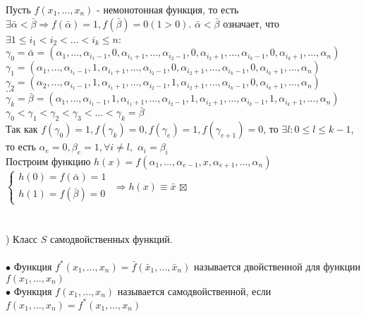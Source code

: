 \documentclass[a4paper, 12pt]{report}
\newcommand{\RomanNumeralCaps}[1]
    {\MakeUppercase{\romannumeral #1}}
\newenvironment{Proof} %
{\par\noindent{$\blacklozenge$}} %
{\hfill$\scriptstyle\boxtimes$} %
\begin{document}
\begin{Proof}
Пусть $f(x_1, \dots, x_n)$ - немонотонная функция, то есть $\exists \bar \alpha < \bar \beta \Rightarrow f(\bar \alpha) = 1, f(\bar \beta) = 0 (1 > 0)$. $\bar \alpha < \bar \beta$ означает, что $\exists 1 \leqslant i_1 < i_2 < \dots < i_k \leqslant n$:\\
$\gamma_0 = \bar \alpha = (\alpha_1, \dots, \alpha_{i_1-1}, 0, \alpha_{i_1+1}, \dots, \alpha_{i_{2}-1}, 0, \alpha_{i_2 +1}, \dots, \alpha_{i_k -1}, 0, \alpha_{i_k +1},\dots,  \alpha_n)$  \\
$\gamma_1 = (\alpha_1, \dots, \alpha_{i_1-1}, 1, \alpha_{i_1+1}, \dots, \alpha_{i_{2}-1}, 0, \alpha_{i_2 +1}, \dots, \alpha_{i_k -1}, 0, \alpha_{i_k +1}, \dots,  \alpha_n)$  \\
$\gamma_2 = (\alpha_2, \dots, \alpha_{i_1-1}, 1, \alpha_{i_1+1}, \dots, \alpha_{i_{2}-1}, 1, \alpha_{i_2 +1}, \dots, \alpha_{i_k -1}, 0, \alpha_{i_k +1}, \dots,  \alpha_n)$  \\
$\dots$\\
$\gamma_k = \bar \beta = (\alpha_1, \dots, \alpha_{i_1-1}, 1, \alpha_{i_1+1}, \dots, \alpha_{i_{2}-1}, 1, \alpha_{i_2 +1}, \dots, \alpha_{i_k -1}, 1, \alpha_{i_k +1}, \dots,  \alpha_n)$  \\
$\gamma_0 < \gamma_1 < \gamma_2 < \gamma_3 < \dots < \gamma_k = \bar \beta$\\
Так как $f(\gamma_0) = 1, f(\gamma_k) = 0, f(\gamma_e) = 1, f(\gamma_{e+1}) = 0$, то $\exists l: 0 \leqslant l \leqslant k-1$, то есть $\alpha_e = 0, \beta_e = 1, \forall i \neq l,$  $\alpha_i = \beta_i$\\
Построим функцию $h(x) = f(\alpha_1, \dots, \alpha_{e-1}, x, \alpha_{e+1}, \dots, \alpha_n)$\\
$\begin{cases}
    h(0)  =  f(\bar \alpha) = 1 \\
    h(1) = f(\bar \beta) = 0
  \end{cases}$ $\Rightarrow h(x) \equiv \bar x$
\end{Proof}\\\\\\
\RomanNumeralCaps{4}) Класс $S$ самодвойственных функций.\\\\
$\bullet$ Функция $f^*(x_1, \dots, x_n) = \bar f( \bar x_1, \dots, \bar x_n)$ называется двойственной для функции $f(x_1, \dots, x_n)$\\
$\bullet$ Функция $f(x_1, \dots, x_n)$ называется самодвойственной, если $f(x_1, \dots, x_n) = f^*(x_1, \dots, x_n)$\\
\end{document}
